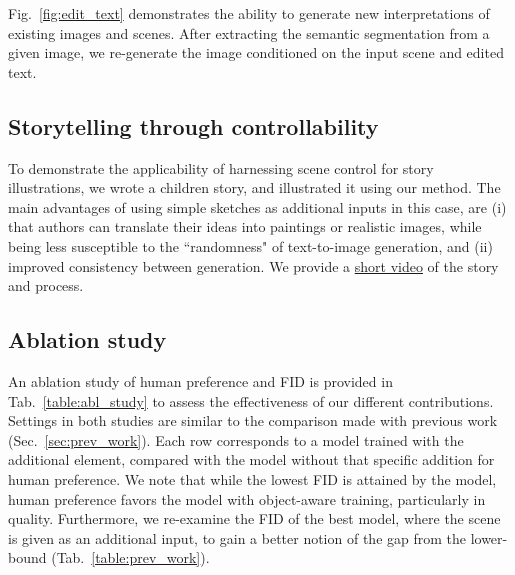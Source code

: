 \documentclass[final]{cvpr}
\begin{document}
Fig.~\ref{fig:edit_text} demonstrates the ability to generate new interpretations of existing images and scenes. After extracting the semantic segmentation from a given image, we re-generate the image conditioned on the input scene and edited text.

\subsection{Storytelling through controllability} 
To demonstrate the applicability of harnessing scene control for story illustrations, we wrote a children story, and illustrated it using our method. The main advantages of using simple sketches as additional inputs in this case, are (i) that authors can translate their ideas into paintings or realistic images, while being less susceptible to the ``randomness" of text-to-image generation, and (ii) improved consistency between generation. We provide a \href{https://youtu.be/QLTyqoJJKTo}{short video} of the story and process.

\subsection{Ablation study}
An ablation study of human preference and FID is provided in Tab.~\ref{table:abl_study} to assess the effectiveness of our different contributions. Settings in both studies are similar to the comparison made with previous work (Sec.~\ref{sec:prev_work}). Each row corresponds to a model trained with the additional element, compared with the model without that specific addition for human preference. We note that while the lowest FID is attained by the  model, human preference favors the  model with object-aware training, particularly in quality. Furthermore, we re-examine the FID of the best model, where the scene is given as an additional input, to gain a better notion of the gap from the lower-bound (Tab.~\ref{table:prev_work}).
\end{document}
